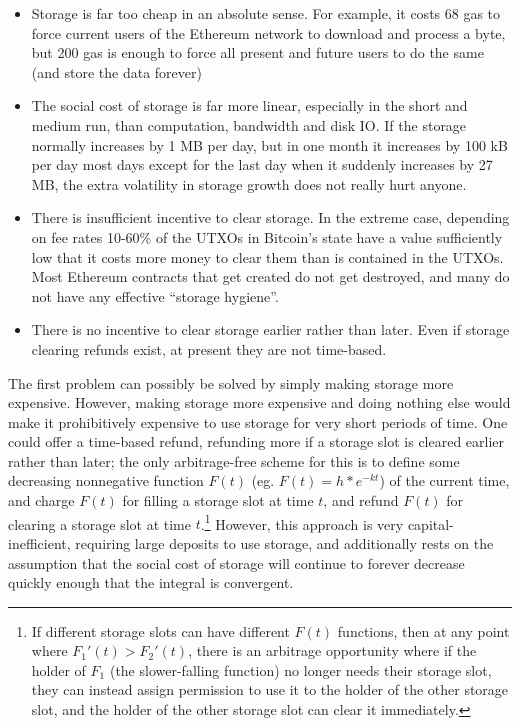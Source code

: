 \documentclass[12pt, final]{article}
\begin{document}
\begin{itemize}
\item Storage is far too cheap in an absolute sense. For example, it costs 68 gas to force current users of the Ethereum network to download and process a byte, but 200 gas is enough to force all present and future users to do the same (and store the data forever)
\item The social cost of storage is far more linear, especially in the short and medium run, than computation, bandwidth and disk IO. If the storage normally increases by 1 MB per day, but in one month it increases by 100 kB per day most days except for the last day when it suddenly increases by 27 MB, the extra volatility in storage growth does not really hurt anyone.
\item There is insufficient incentive to clear storage. In the extreme case, depending on fee rates 10-60\% of the UTXOs in Bitcoin's state\cite{utxo5} have a value sufficiently low that it costs more money to clear them than is contained in the UTXOs. Most Ethereum contracts that get created do not get destroyed, and many do not have any effective ``storage hygiene''.
\item There is no incentive to clear storage earlier rather than later. Even if storage clearing refunds exist, at present they are not time-based.
\end{itemize}

The first problem can possibly be solved by simply making storage more expensive. However, making storage more expensive and doing nothing else would make it prohibitively expensive to use storage for very short periods of time. One could offer a time-based refund, refunding more if a storage slot is cleared earlier rather than later; the only arbitrage-free scheme for this is to define some decreasing nonnegative function $F(t)$ (eg. $F(t) = h * e^{-kt}$) of the current time, and charge $F(t)$ for filling a storage slot at time $t$, and refund $F(t)$ for clearing a storage slot at time $t$.\footnote{If different storage slots can have different $F(t)$ functions, then at any point where $F_1'(t) > F_2'(t)$, there is an arbitrage opportunity where if the holder of $F_1$ (the slower-falling function) no longer needs their storage slot, they can instead assign permission to use it to the holder of the other storage slot, and the holder of the other storage slot can clear it immediately.} However, this approach is very capital-inefficient, requiring large deposits to use storage, and additionally rests on the assumption that the social cost of storage will continue to forever decrease quickly enough that the integral is convergent.
\end{document}
